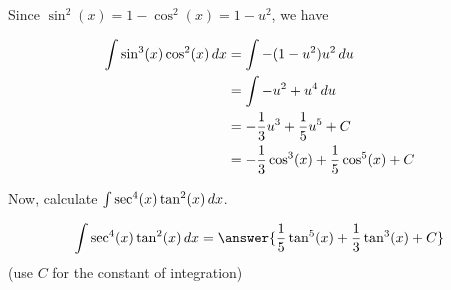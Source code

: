 \documentclass{ximera}
\begin{document}
\begin{exercise}
\begin{example}
Since $\sin^2(x) = 1-\cos^2(x) = 1-u^2$, we have

\begin{align*}
\int \sin^3(x) \cos^2(x) \mathop{}\!d x &=  \int -(1-u^2) u^2 \mathop{}\!d u \\
&= \int -u^2+u^4 \mathop{}\!d u \\
&= -\frac{1}{3}u^3+\frac{1}{5}u^5+C \\
&= -\frac{1}{3}\cos^3(x)+\frac{1}{5}\cos^5(x)+C
\end{align*}
\end{example}

Now, calculate $\int \sec^4(x)\tan^2(x) \mathop{}\!d x$.

\[
\int  \sec^4(x)\tan^2(x) \d x= \answer{\frac{1}{5}\tan^5(x)+\frac{1}{3}\tan^3(x)+C}
\] 
(use $C$ for the constant of integration)

\end{exercise}
\end{document}
